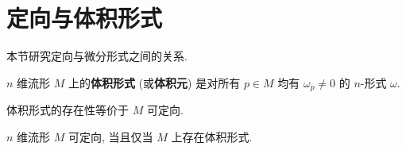 \section{定向与体积形式}\label{sec:orientation-and-volume-forms}

本节研究定向与微分形式之间的关系.

\begin{RiemannDefinition}\label{def:volume-form}
$n$ 维流形 $M$ 上的\textbf{体积形式} (或\textbf{体积元}) 是对所有 $p\in M$ 均有 $\omega_p\ne0$ 的 $n$-形式 $\omega$.
\end{RiemannDefinition}

体积形式的存在性等价于 $M$ 可定向.

\begin{RiemannProposition}\label{prop:orientation-and-existence-of-volume-form}
$n$ 维流形 $M$ 可定向, 当且仅当 $M$ 上存在体积形式.
\end{RiemannProposition}

